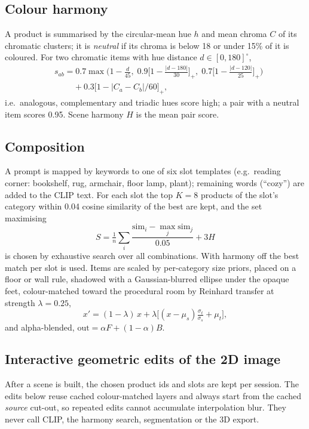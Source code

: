 \documentclass[conference]{IEEEtran}
\begin{document}
\subsection{Colour harmony}
A product is summarised by the circular-mean hue $h$ and mean chroma $C$ of its chromatic clusters; it is \emph{neutral} if its chroma is below 18 or under 15\% of it is coloured. For two chromatic items with hue distance $d\in[0,180]^\circ$,
\begin{equation}
\begin{split}
&s_{ab}=0.7\max\!\Big(1-\tfrac{d}{45},\;0.9\big[1-\tfrac{|d-180|}{30}\big]_+,\;0.7\big[1-\tfrac{|d-120|}{25}\big]_+\Big)\\
&\qquad\;+0.3\big[1-|C_a-C_b|/60\big]_+ ,
\end{split}
\end{equation}
i.e.\ analogous, complementary and triadic hues score high; a pair with a neutral item scores 0.95. Scene harmony $H$ is the mean pair score.

\subsection{Composition}
A prompt is mapped by keywords to one of six slot templates (e.g.\ reading corner: bookshelf, rug, armchair, floor lamp, plant); remaining words (``cozy'') are added to the CLIP text. For each slot the top $K{=}8$ products of the slot's category within 0.04 cosine similarity of the best are kept, and the set maximising
\begin{equation}
S=\tfrac1n\sum_i \frac{\mathrm{sim}_i-\max_j \mathrm{sim}_j}{0.05}+3H
\end{equation}
is chosen by exhaustive search over all combinations. With harmony off the best match per slot is used. Items are scaled by per-category size priors, placed on a floor or wall rule, shadowed with a Gaussian-blurred ellipse under the opaque feet, colour-matched toward the procedural room by Reinhard transfer at strength $\lambda{=}0.25$,
\begin{equation}
x'=(1-\lambda)\,x+\lambda\Big[(x-\mu_s)\tfrac{\sigma_t}{\sigma_s}+\mu_t\Big],
\end{equation}
and alpha-blended, $\mathrm{out}=\alpha F+(1-\alpha)B$.

\subsection{Interactive geometric edits of the 2D image}
After a scene is built, the chosen product ids and slots are kept per session. The edits below reuse cached colour-matched layers and always start from the cached \emph{source} cut-out, so repeated edits cannot accumulate interpolation blur. They never call CLIP, the harmony search, segmentation or the 3D export.
\end{document}

